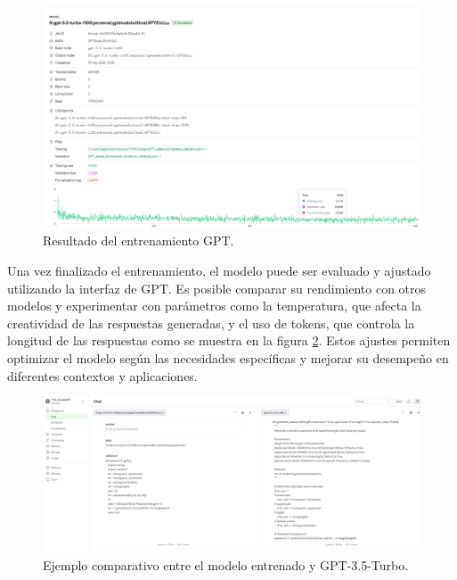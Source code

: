\begin{figure}[htbp!]
  \centering
  \includegraphics[width=\textwidth,keepaspectratio]{imaxes/5_GPT_EntrenamientoInterfaz.png}
  \caption{Resultado del entrenamiento GPT.}
  \label{fig:5_GPT_EntrenamientoInterfaz}
\end{figure}


\newpage %
Una vez finalizado el entrenamiento, el modelo puede ser evaluado y ajustado utilizando la interfaz de \acrshort{GPT}. Es posible comparar su rendimiento con otros modelos y experimentar con parámetros como la temperatura, que afecta la creatividad de las respuestas generadas, y el uso de \gls{token}s, que controla la longitud de las respuestas como se muestra en la figura \ref{fig:5_ComparativaModeloGPT}. Estos ajustes permiten optimizar el modelo según las necesidades específicas y mejorar su desempeño en diferentes contextos y aplicaciones.
\bigskip %

\begin{figure}[htbp!]
  \centering
  \includegraphics[width=\textwidth,keepaspectratio]{imaxes/5_ComparativaModeloGPT.png}
  \caption{Ejemplo comparativo entre el modelo entrenado y GPT-3.5-Turbo.}
  \label{fig:5_ComparativaModeloGPT}
\end{figure}

